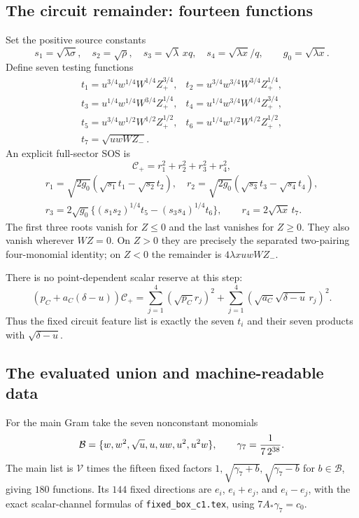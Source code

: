 \subsection{The circuit remainder: fourteen functions}

Set the positive source constants
\[
 s_1=\sqrt{\lambda\sigma},\quad s_2=\sqrt\rho,\quad
 s_3=\sqrt\lambda\,xq,\quad s_4=\sqrt{\lambda x}/q,
 \qquad g_0=\sqrt{\lambda x}.
\]
Define seven testing functions
\[
\begin{array}{ll}
 t_1=u^{3/4}w^{1/4}W^{1/4}Z_+^{3/4},&
 t_2=u^{3/4}w^{3/4}W^{3/4}Z_+^{1/4},\\
 t_3=u^{1/4}w^{1/4}W^{3/4}Z_+^{1/4},&
 t_4=u^{1/4}w^{3/4}W^{1/4}Z_+^{3/4},\\
 t_5=u^{3/4}w^{1/2}W^{1/2}Z_+^{1/2},&
 t_6=u^{1/4}w^{1/2}W^{1/2}Z_+^{1/2},\\
 t_7=\sqrt{uwWZ_-}.&
\end{array}
\]
An explicit full-sector SOS is
\[
 \mathscr C_+=r_1^2+r_2^2+r_3^2+r_4^2,
\]
\[
\begin{gathered}
 r_1=\sqrt{2g_0}(\sqrt{s_1}t_1-\sqrt{s_2}t_2),\quad
 r_2=\sqrt{2g_0}(\sqrt{s_3}t_3-\sqrt{s_4}t_4),\\
 r_3=2\sqrt{g_0}\{(s_1s_2)^{1/4}t_5-(s_3s_4)^{1/4}t_6\},
 \qquad r_4=2\sqrt{\lambda x}\,t_7.
\end{gathered}
\]
The first three roots vanish for $Z\le0$ and the last vanishes
for $Z\ge0$. They also vanish wherever $WZ=0$. On $Z>0$ they
are precisely the separated two-pairing four-monomial identity;
on $Z<0$ the remainder is $4\lambda xuwWZ_-$.

There is no point-dependent scalar reserve at this step:
\[
 (p_C+a_C(\delta-u))\mathscr C_+
      =\sum_{j=1}^4(\sqrt{p_C}r_j)^2
        +\sum_{j=1}^4(\sqrt{a_C}\sqrt{\delta-u}\,r_j)^2.
\]
Thus the fixed circuit feature list is exactly the seven $t_i$
and their seven products with $\sqrt{\delta-u}$.

\subsection{The evaluated union and machine-readable data}

For the main Gram take the seven nonconstant monomials
\[
 \mathcal B=\{w,w^2,\sqrt u,u,uw,u^2,u^2w\},\qquad
 \gamma_7={1\over7\,2^{38}}.
\]
The main list is $\mathcal V$ times the fifteen fixed factors
$1,\sqrt{\gamma_7+b},\sqrt{\gamma_7-b}$ for $b\in\mathcal B$,
giving $180$ functions. Its $144$ fixed directions are $e_i$,
$e_i+e_j$, and $e_i-e_j$, with the exact scalar-channel formulas
of \texttt{fixed\_box\_c1.tex}, using $7A_*\gamma_7=c_0$.

